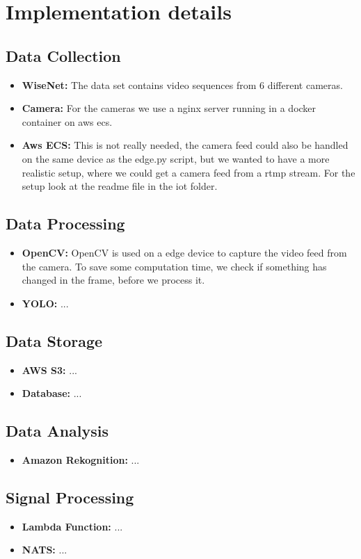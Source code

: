 \documentclass[conference]{IEEEtran}
\begin{document}
\section{Implementation details}
\subsection{Data Collection}
\begin{itemize}
    \item \textbf{WiseNet:} The data set contains video sequences from 6 different cameras.  
    \item \textbf{Camera:} For the cameras we use a nginx server running in a docker container on aws ecs.
    \item \textbf{Aws ECS:} This is not really needed, the camera feed could also be handled on the same device 
    as the edge.py script, but we wanted to have a more realistic setup, where we could get a camera feed from
    a rtmp stream. For the setup look at the readme file in the iot folder. 
\end{itemize}
\subsection{Data Processing}
\begin{itemize}
    \item \textbf{OpenCV:} OpenCV is used on a edge device to capture the video feed from the camera. To save some
    computation time, we check if something has changed in the frame, before we process it.
    \item \textbf{YOLO:} ...
\end{itemize}
\subsection{Data Storage}
\begin{itemize}
    \item \textbf{AWS S3:} ...
    \item \textbf{Database:} ...
\end{itemize}
\subsection{Data Analysis}
\begin{itemize}
    \item \textbf{Amazon Rekognition:} ...
\end{itemize}
\subsection{Signal Processing}  
\begin{itemize}
    \item \textbf{Lambda Function:} ...
    \item \textbf{NATS:} ...
\end{itemize}
\end{document}
